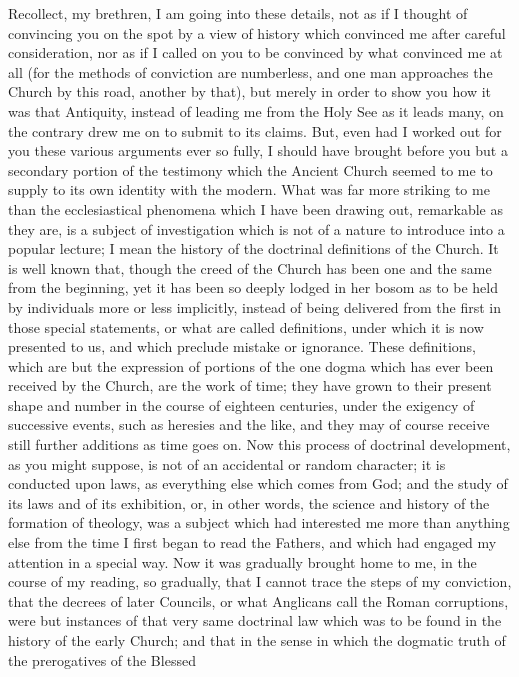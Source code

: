 Recollect, my brethren, I am going into these details, not as if I
thought of convincing you on the spot by a view of history which
convinced me after careful consideration, nor as if I called on you to
be convinced by what convinced me at all (for the methods of
conviction are numberless, and one man approaches the Church by this
road, another by that), but merely in order to show you how it was
that Antiquity, instead of leading me from the Holy See as it leads
many, on the contrary drew me on to submit to its claims. But, even
had I worked out for you these various arguments ever so fully, I
should have brought before you but a secondary portion of the
testimony which the Ancient Church seemed to me to supply to its own
identity with the modern. What was far more striking to me than the
ecclesiastical phenomena which I have been drawing out, remarkable as
they are, is a subject of investigation which is not of a nature to
introduce into a popular lecture; I mean the history of the doctrinal
definitions of the Church. It is well known that, though the creed of
the Church has been one and the same from the beginning, yet it has
been so deeply lodged in her bosom as to be held by individuals more
or less implicitly, instead of being delivered from the first in those
special statements, or what are called definitions, under which it is
now presented to us, and which preclude mistake or ignorance. These
definitions, which are but the expression of portions of the one dogma
which has ever been received by the Church, are the work of time; they
have grown to their present shape and number in the course of eighteen
centuries, under the exigency of successive events, such as heresies
and the like, and they may of course receive still further additions
as time goes on. Now this process of doctrinal development, as you
might suppose, is not of an accidental or random character; it is
conducted upon laws, as everything else which comes from God; and the
study of its laws and of its exhibition, or, in other words, the
science and history of the formation of theology, was a subject which
had interested me more than anything else from the time I first began
to read the Fathers, and which had engaged my attention in a special
way. Now it was gradually brought home to me, in the course of my
reading, so gradually, that I cannot trace the steps of my conviction,
that the decrees of later Councils, or what Anglicans call the Roman
corruptions, were but instances of that very same doctrinal law which
was to be found in the history of the early Church; and that in the
sense in which the dogmatic truth of the prerogatives of the Blessed
